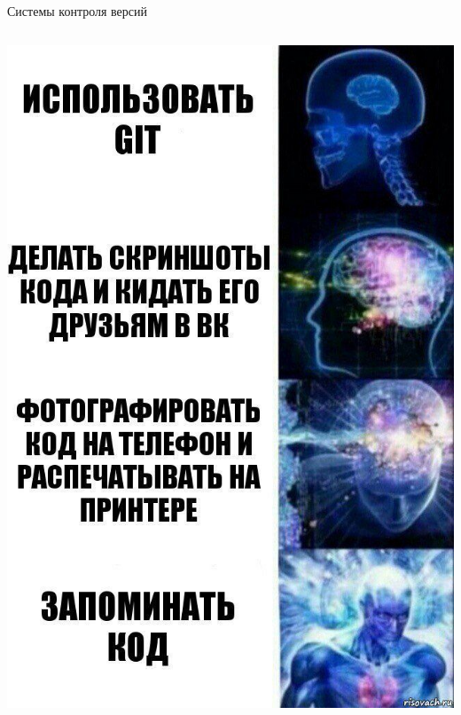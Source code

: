 \begin{frame}{Системы контроля версий}
\begin{columns}
\begin{column}{0.4\textwidth}
                  \includegraphics[width=\textwidth,height=0.8\textheight,keepaspectratio]{images/memes/use-git-mofo.jpg}
            \end{column}
      \end{columns}
    
\end{frame}